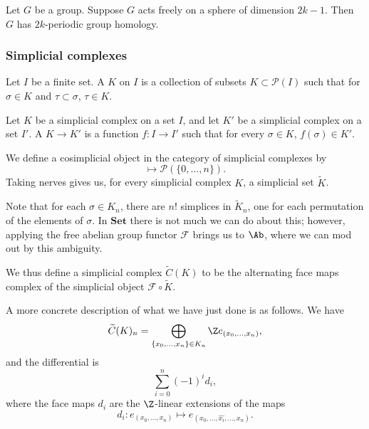 \documentclass[main.tex]{subfiles}
\begin{document}
\begin{fact}
  \label{fact:periodicity_in_group_homology}
  Let $G$ be a group. Suppose $G$ acts freely on a sphere of dimension $2k-1$. Then $G$ has $2k$-periodic group homology.
\end{fact}

\subsubsection{Simplicial complexes}
\label{sss:simplicial_complexes}

\begin{definition}
  \label{def:simplicial_complex}
  Let $I$ be a finite set. A  $K$ on $I$ is a collection of subsets $K \subset \mathcal{P}(I)$ such that for $\sigma \in K$ and $\tau \subset \sigma$, $\tau \in K$.

  Let $K$ be a simplicial complex on a set $I$, and let $K'$ be a simplicial complex on a set $I'$. A  $K \to K'$ is a function $f\colon I \to I'$ such that for every $\sigma \in K$, $f(\sigma) \in K'$.
\end{definition}

We define a cosimplicial object in the category of simplicial complexes by
\begin{equation*}
  [n] \mapsto \mathcal{P}(\{0, \ldots, n\}).
\end{equation*}
Taking nerves gives us, for every simplicial complex $K$, a simplicial set $\tilde{K}$.

Note that for each $\sigma \in K_{n}$, there are $n!$ simplices in $\tilde{K}_{n}$, one for each permutation of the elements of $\sigma$. In $\mathbf{Set}$ there is not much we can do about this; however, applying the free abelian group functor $\mathcal{F}$ brings us to $\Ab$, where we can mod out by this ambiguity.

We thus define a simplicial complex $\widetilde{C}(K)$ to be the alternating face maps complex of the simplicial object $\mathcal{F} \circ \tilde{K}$.

A more concrete description of what we have just done is as follows. We have
\begin{equation*}
  \widetilde{C}(K)_{n} = \bigoplus_{\{x_{0}, \ldots, x_{n}\} \in K_{n}} \Z e_{(x_{0}, \ldots, x_{n})},
\end{equation*}
and the differential is
\begin{equation*}
  \sum_{i = 0}^{n} (-1)^{i} d_{i},
\end{equation*}
where the face maps $d_{i}$ are the $\Z$-linear extensions of the maps
\begin{equation*}
  d_{i}\colon e_{(x_{0}, \ldots, x_{n})} \mapsto e_{(x_{0}, \ldots, \widehat{x_{i}}, \ldots, x_{n})}.
\end{equation*}
\end{document}
